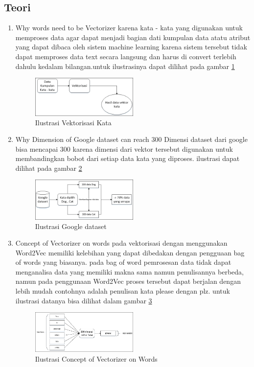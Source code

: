 \subsection{Teori}
\begin{enumerate}
\item Why words need to be Vectorizer
\subitem karena kata - kata yang digunakan untuk memproses data agar dapat menjadi bagian dati kumpulan data atatu atribut yang dapat dibaca oleh sistem machine learning karena sistem tersebut tidak dapat memproses data text secara langsung dan harus di convert terlebih dahulu kedalam bilangan.untuk ilustrasinya dapat dilihat pada gambar \ref{fig1}
\begin{figure}[!htbp]
	\centering
	\includegraphics[width=0.5\textwidth]{figures/fathi/chapter5/hari1/1}
	\caption{Ilustrasi Vektorisasi Kata}
	\label{fig1}
\end{figure}

\item Why Dimension of Google dataset can reach 300
\subitem Dimensi dataset dari google bisa mencapai 300 karena dimensi dari vektor tersebut digunakan untuk membandingkan bobot dari setiap data kata yang diproses. ilustrasi dapat dilihat pada gambar \ref{fig2}
\begin{figure}[!htbp]
	\centering
	\includegraphics[width=0.5\textwidth]{figures/fathi/chapter5/hari1/2}
	\caption{Ilustrasi Google dataset}
	\label{fig2}
\end{figure}

\item Concept of Vectorizer on words
\subitem pada vektorisasi dengan menggunakan Word2Vec memiliki kelebihan yang dapat dibedakan dengan pengguaan bag of words yang biasanya.  pada bag of word pemrosesan data tidak dapat menganalisa data yang memiliki makna sama namun penulisannya berbeda, namun pada penggunaan Word2Vec proses tersebut dapat berjalan dengan lebih mudah contohnya adalah penulisan kata please dengan plz. untuk ilustrasi datanya bisa dilihat dalam gambar \ref{fig3}
\begin{figure}[!htbp]
	\centering
	\includegraphics[width=0.5\textwidth]{figures/fathi/chapter5/hari1/3}
	\caption{Ilustrasi Concept of Vectorizer on Words}
	\label{fig3}
\end{figure}


\end{enumerate}
